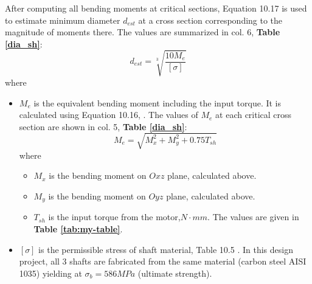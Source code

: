 
After computing all bending moments at critical sections, Equation 10.17 \cite{tk1} is used to estimate minimum diameter $ d_{est} $ at a cross section corresponding to the magnitude of moments there. The values are summarized in col. 6, \textbf{Table \ref{dia_sh}}:
\[
d_{est} = \sqrt[3]{\dfrac{10M_e}{[\sigma]}}
\]
where
\begin{itemize}
	\item $ M_e $ is the equivalent bending moment including the input torque. It is calculated using Equation 10.16, \cite{tk1}. The values of $ M_e $ at each critical cross section are shown in col. 5, \textbf{Table \ref{dia_sh}}:
	\[
	M_e = \sqrt{M_x^2 + M_y^2 + 0.75T_{sh}}
	\]
	where
	\begin{itemize}
		\item $ M_x $ is the bending moment on $ Oxz $ plane, calculated above.
		\item $ M_y $ is the bending moment on $ Oyz $ plane, calculated above.
		\item $ T_{sh} $ is the input torque from the motor,$ \unit{N\cdot mm} $. The values are given in \textbf{Table \ref{tab:my-table}}.
	\end{itemize}
	\item $ [\sigma] $ is the permissible stress of shaft material, Table 10.5 \cite{tk1}. In this design project, all 3 shafts are fabricated from the same material (carbon steel AISI 1035) yielding at $ \sigma_b = 586\unit{MPa} $ (ultimate strength).
\end{itemize}

